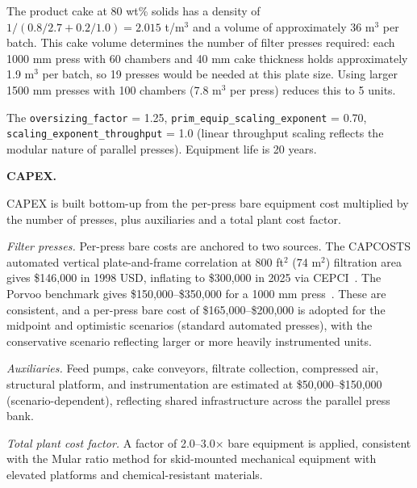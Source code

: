 The product cake at 80 wt\% solids has a density of $1/(0.8/2.7 + 0.2/1.0) = 2.015$ t/m$^3$ and a volume of approximately 36 m$^3$ per batch. This cake volume determines the number of filter presses required: each 1000 mm press with 60 chambers and 40 mm cake thickness holds approximately 1.9 m$^3$ per batch, so 19 presses would be needed at this plate size. Using larger 1500 mm presses with 100 chambers (7.8 m$^3$ per press) reduces this to 5 units.

The \texttt{oversizing\_factor} = 1.25, \texttt{prim\_equip\_scaling\_exponent} = 0.70, \texttt{scaling\_exponent\_throughput} = 1.0 (linear throughput scaling reflects the modular nature of parallel presses). Equipment life is 20 years.

\medskip
\noindent\textbf{CAPEX.}\quad

CAPEX is built bottom-up from the per-press bare equipment cost multiplied by the number of presses, plus auxiliaries and a total plant cost factor.

\textit{Filter presses.} Per-press bare costs are anchored to two sources. The CAPCOSTS automated vertical plate-and-frame correlation at 800 ft$^2$ (74 m$^2$) filtration area gives \$146,000 in 1998 USD, inflating to \$300,000 in 2025 via CEPCI~\citep[Figure~182]{mularCAPCOSTSHandbookEstimating1998}. The Porvoo benchmark gives \$150,000--\$350,000 for a 1000 mm press~\citep{porvooIndustrialFilterPress2025}. These are consistent, and a per-press bare cost of \$165,000--\$200,000 is adopted for the midpoint and optimistic scenarios (standard automated presses), with the conservative scenario reflecting larger or more heavily instrumented units.

\textit{Auxiliaries.} Feed pumps, cake conveyors, filtrate collection, compressed air, structural platform, and instrumentation are estimated at \$50,000--\$150,000 (scenario-dependent), reflecting shared infrastructure across the parallel press bank.

\textit{Total plant cost factor.} A factor of 2.0--3.0$\times$ bare equipment is applied, consistent with the Mular ratio method for skid-mounted mechanical equipment with elevated platforms and chemical-resistant materials.

